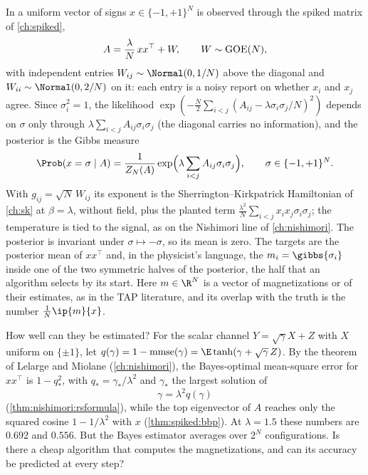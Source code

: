 \begin{refsection}
In  a uniform vector of signs $x\in\{-1,+1\}^N$ is observed through the spiked matrix of \cref{ch:spiked},
\[
A=\frac\lambda N\,xx^\top+W,\qquad W\sim\mathrm{GOE}(N),
\]
with independent entries $W_{ij}\sim\Normal(0,1/N)$ above the diagonal and $W_{ii}\sim\Normal(0,2/N)$ on it: each entry is a noisy report on whether $x_i$ and $x_j$ agree. Since $\sigma_i^2=1$, the likelihood $\exp(-\frac N2\sum_{i<j}(A_{ij}-\lambda\sigma_i\sigma_j/N)^2)$ depends on $\sigma$ only through $\lambda\sum_{i<j}A_{ij}\sigma_i\sigma_j$ (the diagonal carries no information), and the posterior is the Gibbs measure
\begin{equation}\label{eq:amp:posterior}
\Prob(x=\sigma\mid A)=\frac1{Z_N(A)}\exp\Bigl(\lambda\sum_{i<j}A_{ij}\sigma_i\sigma_j\Bigr),\qquad\sigma\in\{-1,+1\}^N.
\end{equation}
With $g_{ij}=\sqrt N\,W_{ij}$ its exponent is the Sherrington--Kirkpatrick Hamiltonian of \cref{ch:sk} at $\beta=\lambda$, without field, plus the planted term $\frac{\lambda^2}N\sum_{i<j}x_ix_j\sigma_i\sigma_j$; the temperature is tied to the signal, as on the Nishimori line of \cref{ch:nishimori}. The posterior is invariant under $\sigma\mapsto-\sigma$, so its mean is zero. The targets are the posterior mean of $xx^\top$ and, in the physicist's language, the  $m_i=\gibbs{\sigma_i}$ inside one of the two symmetric halves of the posterior, the half that an algorithm selects by its start. Here $m\in\R^N$ is a vector of magnetizations or of their estimates, as in the TAP literature, and its overlap with the truth is the number $\frac1N\ip{m}{x}$.

How well can they be estimated? For the scalar channel $Y=\sqrt\gamma X+Z$ with $X$ uniform on $\{\pm1\}$, let $q(\gamma)=1-\ampmmse(\gamma)=\E\tanh(\gamma+\sqrt\gamma\,Z)$. By the theorem of Lelarge and Miolane (\cref{ch:nishimori}), the Bayes-optimal mean-square error for $xx^\top$ is $1-q_*^2$, with $q_*=\gamma_*/\lambda^2$ and $\gamma_*$ the largest solution of
\begin{equation}\label{eq:amp:fixedpoint}
\gamma=\lambda^2q(\gamma)
\end{equation}
(\cref{thm:nishimori:rsformula}), while the top eigenvector of $A$ reaches only the squared cosine $1-1/\lambda^2$ with $x$ (\cref{thm:spiked:bbp}). At $\lambda=1.5$ these numbers are $0.692$ and $0.556$. But the Bayes estimator averages over $2^N$ configurations. Is there a cheap algorithm that computes the magnetizations, and can its accuracy be predicted at every step?


\end{refsection}
